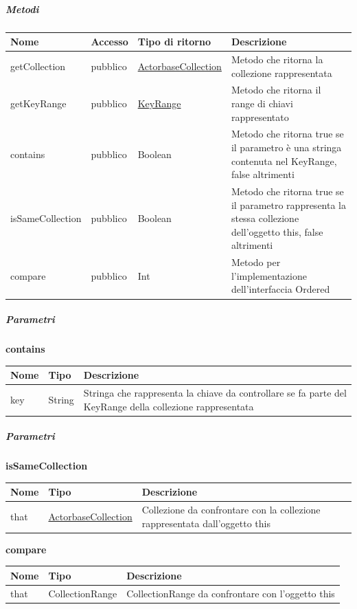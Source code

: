 \documentclass{scalatekids-article}
\begin{document}
\subparagraph{Metodi}
\begin{tabular}{| p{3cm} | p{1.5cm} | p{3.5cm} | p{9cm} |}
  \hline
  Nome & Accesso & Tipo di ritorno & Descrizione\\
  \hline
  getCollection & pubblico & \hyperref[sec:actorbase::actorsystem::utils::ActorbaseCollection]{ActorbaseCollection} & Metodo che ritorna la collezione rappresentata \\
  \hline
  getKeyRange & pubblico & \hyperref[sec:actorbase::actorsystem::utils::KeyRange]{KeyRange} & Metodo che ritorna il range di chiavi rappresentato \\
  \hline
  contains & pubblico & Boolean & Metodo che ritorna true se il parametro è una stringa contenuta nel KeyRange, false altrimenti\\
  \hline
  isSameCollection & pubblico & Boolean & Metodo che ritorna true se il parametro rappresenta la stessa collezione dell'oggetto this, false altrimenti \\
  \hline
  compare & pubblico & Int & Metodo per l'implementazione dell'interfaccia Ordered \\
  \hline
\end{tabular}

\subparagraph{Parametri}
\begin{center}
  \textbf{contains}\\
\end{center}
\begin{tabular}{| p{1.5cm} | p{1.5cm} | p{9cm} |}
  \hline
  Nome & Tipo & Descrizione\\
  \hline
  key & String & Stringa che rappresenta la chiave da controllare se fa parte del KeyRange della collezione rappresentata \\
  \hline
\end{tabular}

\subparagraph{Parametri}
\begin{center}
  \textbf{isSameCollection}\\
\end{center}
\begin{tabular}{| l | l | l |}
  \hline
  Nome & Tipo & Descrizione\\
  \hline
  that & \hyperref[sec:actorbase::actorsystem::utils::ActorbaseCollection]{ActorbaseCollection} & Collezione da confrontare con la collezione rappresentata dall'oggetto this \\
  \hline
\end{tabular}

\begin{center}
  \textbf{compare}\\
\end{center}
\begin{tabular}{| l | l | l |}
  \hline
  Nome & Tipo & Descrizione\\
  \hline
  that & CollectionRange & CollectionRange da confrontare con l'oggetto this \\
  \hline
\end{tabular}
\end{document}
